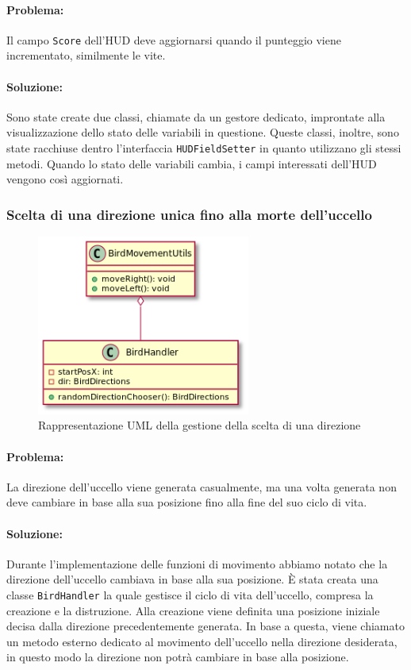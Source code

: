 \documentclass[a4paper,12pt]{report}
\begin{document}
\paragraph{Problema:} Il campo \texttt{Score} dell’HUD deve aggiornarsi quando il punteggio viene incrementato, similmente le vite.

\paragraph{Soluzione:} Sono state create due classi, chiamate da un gestore dedicato, improntate alla visualizzazione dello stato delle variabili in questione. Queste classi, inoltre, sono state racchiuse dentro l’interfaccia \texttt{HUDFieldSetter} in quanto utilizzano gli stessi metodi. Quando lo stato delle variabili cambia, i campi interessati dell’HUD vengono così aggiornati. 

\newpage
\subsubsection{Scelta di una direzione unica fino alla morte dell'uccello}
\begin{figure}[H]
    \centering{}
    \includegraphics[width=7cm]{img/direct.png}
    \caption{Rappresentazione UML della gestione della scelta di una direzione}
\end{figure}

\paragraph{Problema:} La direzione dell’uccello viene generata casualmente, ma una volta generata non deve cambiare in base alla sua posizione fino alla fine del suo ciclo di vita.

\paragraph{Soluzione:} Durante l'implementazione delle funzioni di movimento abbiamo notato che la direzione dell'uccello cambiava in base alla sua posizione. È stata creata una classe \texttt{BirdHandler} la quale gestisce il ciclo di vita dell’uccello, compresa la creazione e la distruzione. Alla creazione viene definita una posizione iniziale decisa dalla direzione precedentemente generata. In base a questa, viene chiamato un metodo esterno dedicato al movimento dell’uccello nella direzione desiderata, in questo modo la direzione non potrà cambiare in base alla posizione.
\end{document}
